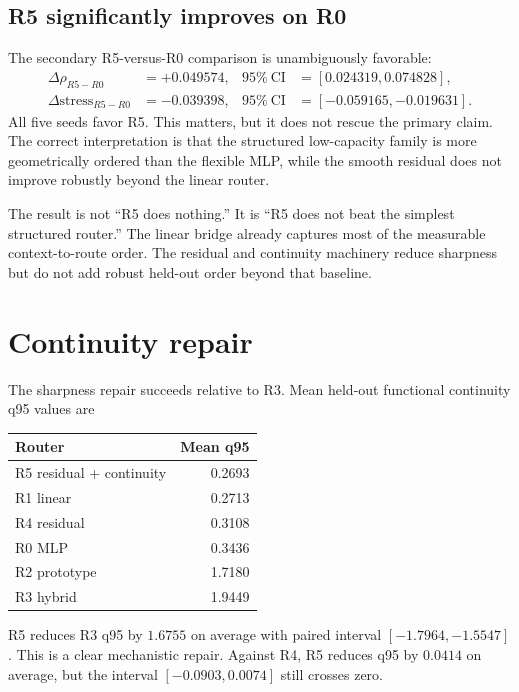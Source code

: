 \documentclass[11pt,a4paper]{article}
\begin{document}
\subsection{R5 significantly improves on R0}
The secondary R5-versus-R0 comparison is unambiguously favorable:
\begin{align}
 \Delta\rho_{R5-R0}&=+0.049574,
 &95\%\ \mathrm{CI}&=[0.024319,0.074828],\\
 \Delta\mathrm{stress}_{R5-R0}&=-0.039398,
 &95\%\ \mathrm{CI}&=[-0.059165,-0.019631].
\end{align}
All five seeds favor R5. This matters, but it does not rescue the primary claim. The correct interpretation is that the structured low-capacity family is more geometrically ordered than the flexible MLP, while the smooth residual does not improve robustly beyond the linear router.

\begin{plainbox}
The result is not ``R5 does nothing.'' It is ``R5 does not beat the simplest structured router.'' The linear bridge already captures most of the measurable context-to-route order. The residual and continuity machinery reduce sharpness but do not add robust held-out order beyond that baseline.
\end{plainbox}

\section{Continuity repair}
The sharpness repair succeeds relative to R3. Mean held-out functional continuity q95 values are
\begin{center}
\begin{tabular}{lr}
\toprule
Router & Mean q95 \\
\midrule
R5 residual + continuity & 0.2693 \\
R1 linear & 0.2713 \\
R4 residual & 0.3108 \\
R0 MLP & 0.3436 \\
R2 prototype & 1.7180 \\
R3 hybrid & 1.9449 \\
\bottomrule
\end{tabular}
\end{center}
R5 reduces R3 q95 by $1.6755$ on average with paired interval $[-1.7964,-1.5547]$. This is a clear mechanistic repair. Against R4, R5 reduces q95 by $0.0414$ on average, but the interval $[-0.0903,0.0074]$ still crosses zero.
\end{document}
